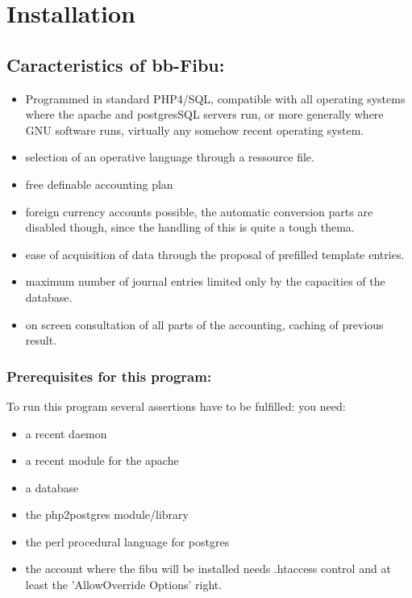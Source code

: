 \chapter{Installation}

\section{Caracteristics of bb-Fibu:}

\begin{itemize}

\item Programmed in standard PHP4/SQL, compatible with all operating systems where the apache and postgresSQL servers run, or more generally where GNU software runs, virtually any somehow recent operating system.

\item selection of an operative language through a ressource file.

\item free definable accounting plan

\item foreign currency accounts possible, the automatic conversion parts are disabled though, since the handling of this is quite a tough thema.

\item ease of acquisition of data through the proposal of prefilled template entries.

\item maximum number of journal entries limited only by the capacities of the database.

\item on screen consultation of all parts of the accounting, caching of
previous result.

\end{itemize}

\subsection{ Prerequisites for this program:}

To run this program several assertions have to be fulfilled:
you need:

\begin{itemize}


\item a recent  daemon
\item a recent  module for the apache
\item a  database
\item the php2postgres module/library
\item the perl procedural language for postgres
\item the account where the fibu will be installed needs .htaccess control and at least the 'AllowOverride Options' right.


\end{itemize}

